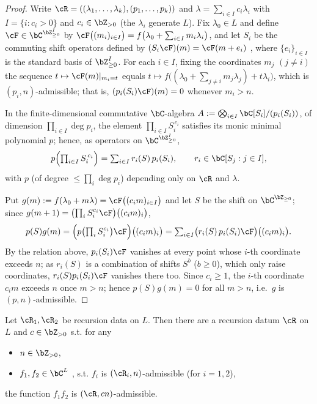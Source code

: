 \documentclass[12pt,a4paper]{amsart}%
\newcommand{\RamiA}[1]{{{#1}}}
\newcommand{\RamiB}[1]{{{#1}}}
\newcommand{\DimaA}[1]{{{#1}}}
\begin{document}
\begin{proof}
Write \DimaA{$\cR=((\lambda_1,\dots,\lambda_k),(p_1,\dots,p_k))$ and}  $\lambda=\sum_{i\in I}c_i\lambda_i$ with $I=\{i:c_i>0\}$ and $c_i\in\Z_{>0}$ (the $\lambda_i$ generate $L$). Fix $\lambda_0\in L$ and define $\cF\in\C^{\Z_{\geq0}^I}$ by $\cF\bigl((m_i)_{i\in I}\bigr)=f\bigl(\lambda_0+\sum_{i\in I}m_i\lambda_i\bigr)$, and let $S_i$ be the commuting shift \RamiA{operators defined by} $(S_i\cF)(m)=\cF(m+e_i)$
\RamiB{, where $\{e_i\}_{i\in I}$ is the standard basis of $\Z_{\geq 0}^I$}. For each $i\in I$, fixing the coordinates $m_j$ $(j\neq i)$ the sequence $t\mapsto \cF(m)|_{m_i=t}$ equals $t\mapsto f\bigl((\lambda_0+\sum_{j\neq i}m_j\lambda_j)+t\lambda_i\bigr)$, which is $(p_i,n)$-admissible; that is, $\RamiA{(p_i(S_i)\cF)}(m)=0$ whenever $m_i>n$.

In the finite-dimensional commutative $\C$-algebra $A:=\bigotimes_{i\in I}\C[S_i]/(p_i(S_i))$, of dimension $\prod_{i\in I}\deg p_i$, the element $\prod_{i\in I}S_i^{\,c_i}$ satisfies its monic minimal polynomial $p$; hence, as operators on $\C^{\Z_{\geq0}^I}$,
$$p\Bigl(\textstyle\prod_{i\in I}S_i^{\,c_i}\Bigr)=\sum_{i\in I}r_i(S)\,p_i(S_i),\qquad r_i\in\C[S_j:j\in I],$$
with $p$ (of degree $\leq\prod_i\deg p_i$) depending only on $\cR$ and $\lambda$.

Put $g(m):=f(\lambda_0+m\lambda)=\cF\bigl((c_im)_{i\in I}\bigr)$ and let $S$ be the shift on $\C^{\Z_{\geq0}}$; since $g(m+1)=\bigl(\prod_iS_i^{c_i}\cF\bigr)\bigl((c_im)_i\bigr)$,
$$p(S)g(m)=\Bigl(p\bigl(\textstyle\prod_iS_i^{c_i}\bigr)\cF\Bigr)\bigl((c_im)_i\bigr)=\sum_{i\in I}\bigl(r_i(S)\,p_i(S_i)\cF\bigr)\bigl((c_im)_i\bigr).$$
By the relation above, $p_i(S_i)\cF$ vanishes at every point whose $i$-th coordinate exceeds $n$; as $r_i(S)$ is a combination of shifts $S^b$ ($b\geq0$), which only raise coordinates, $r_i(S)p_i(S_i)\cF$ vanishes there too. Since $c_i\geq1$, the $i$-th coordinate $c_im$ exceeds $n$ once $m>n$; hence $p(S)g(m)=0$ for all $m>n$, i.e.\ $g$ is $(p,n)$-admissible.
\end{proof}
 \begin{cor}\label{cor:cone.prod}
     Let  $\cR_1,\cR_2$   be recursion data on $L$.
     Then there are  a recursion datum $\cR$ on $L$ and $c\in\Z_{>0}$  s.t. for any
     \begin{itemize}
          \item
     $n\in \Z_{>0}$, \item $f_1,f_2\in \C^{L}$ , s.t. $f_i$ is $(\cR_i,n)$-admissible (for $i=1,2$),
          \end{itemize}
the function
     $f_1f_2$ is $(\cR,cn)$-admissible.
 \end{cor}
\end{document}
